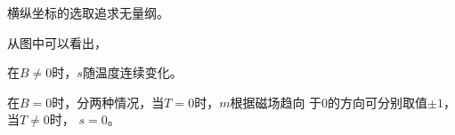 横纵坐标的选取追求无量纲。

从图中可以看出，

在$B\neq 0$时，$s$随温度连续变化。

在$B=0$时，分两种情况，当$T=0$时，$m$根据磁场趋向
于0的方向可分别取值$\pm1$，当$T\neq0$时， $s=0$。







